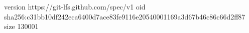 version https://git-lfs.github.com/spec/v1
oid sha256:c31bb10df242eca6400d7ace83fe9116e20540001169a3d67b46c86c66d2ff87
size 130001

